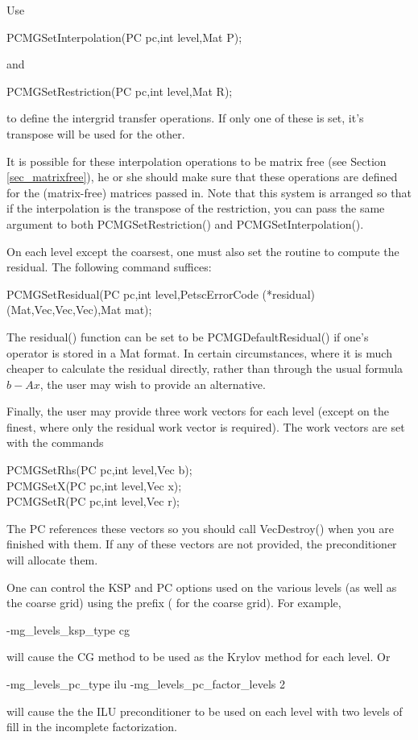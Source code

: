 Use
\begin{tabbing}
  PCMGSetInterpolation(PC pc,int level,Mat P);
\end{tabbing}
and
\begin{tabbing}
  PCMGSetRestriction(PC pc,int level,Mat R);
\end{tabbing}
to define the intergrid transfer operations.  If only one of these is
set, it's transpose will be used for the other.

It is possible for these interpolation operations to be matrix free
(see Section \ref{sec_matrixfree}),
he or she should make sure that these operations are defined for the (matrix-free) matrices
passed in. 
Note that this system is arranged so that if the interpolation is 
the transpose of the restriction, you can pass the same 
argument to both PCMGSetRestriction() and PCMGSetInterpolation().

On each level except the coarsest, one must also set the routine to 
compute the residual.  The following command suffices:
\begin{tabbing}
   PCMGSetResidual(PC pc,int level,PetscErrorCode (*residual)(Mat,Vec,Vec,Vec),Mat mat);
\end{tabbing}
The residual() function can be set to be PCMGDefaultResidual()
if
one's operator is stored in a Mat format.  In certain circumstances, 
where it is much cheaper to calculate the residual directly, rather 
than through the usual formula $b - Ax$,  the user may wish to provide 
an alternative. 

Finally, the user may provide three work vectors for each level 
(except on the finest, where only the residual work vector is required).
The work vectors are set with the 
commands
\begin{tabbing}
  PCMGSetRhs(PC pc,int level,Vec b);\\
  PCMGSetX(PC pc,int level,Vec x);\\
  PCMGSetR(PC pc,int level,Vec r);
\end{tabbing}
The PC references these vectors so you should call VecDestroy()
when you are finished with them.  If any of these vectors are not
provided, the preconditioner will allocate them.

One can control the KSP and PC options used on the various levels
(as well as the coarse grid) using the prefix  
( for the coarse grid).
 For example,
\begin{tabbing}
  -mg\_levels\_ksp\_type cg
\end{tabbing}
will cause the CG method to be used as the Krylov method for each level.
Or
\begin{tabbing}
  -mg\_levels\_pc\_type ilu -mg\_levels\_pc\_factor\_levels 2
\end{tabbing}
will cause the the ILU preconditioner to be used on each level with 
two levels of fill in the incomplete factorization.

